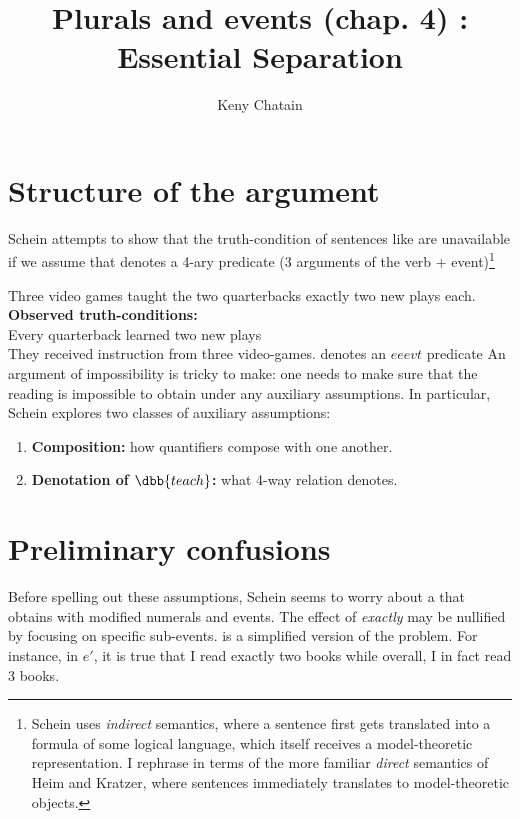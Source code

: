 \documentclass[english]{article}
\title{Plurals and events (chap. 4) : Essential Separation}
\author{Keny Chatain}
\begin{document}
\maketitle

\section*{Structure of the argument}

Schein attempts to show that the truth-condition of sentences like  are unavailable if we assume that  denotes a 4-ary predicate (3 arguments of the verb + event)\footnote{Schein uses \emph{indirect} semantics, where a sentence first gets translated into a formula of some logical language, which itself receives a model-theoretic representation. I rephrase in terms of the more familiar \emph{direct} semantics of Heim and Kratzer, where sentences immediately translates to model-theoretic objects.}

\pex
\a Three video games taught the two quarterbacks exactly two new plays each. \label{quat}
\a \textbf{Observed truth-conditions:}\\
Every quarterback learned two new plays\\
They received instruction from three video-games.
\a {} denotes an $eeevt$ predicate
\xe
%
An argument of impossibility is tricky to make: one needs to make sure that the reading is impossible to obtain under any auxiliary assumptions. In particular, Schein explores two classes of auxiliary assumptions:

\begin{enumerate}
\item \textbf{Composition:} how quantifiers compose with one another.
\item \textbf{Denotation of $\dbb{teach}$:} what 4-way relation  denotes.
\end{enumerate}
%

\section{Preliminary confusions}
Before spelling out these assumptions, Schein seems to worry about a  that obtains with modified numerals and events. 
The effect of \emph{exactly} may be nullified by focusing on specific sub-events. \cnextx is a simplified version of the problem. For instance, in $e'$, it is true that I read exactly two books while overall, I in fact read 3 books.
\end{document}
